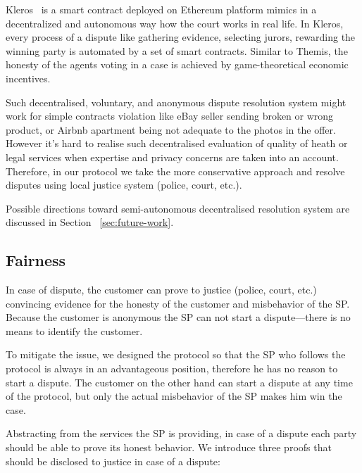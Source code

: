 \documentclass{ieeeaccess}
\begin{document}
Kleros~\cite{lesaege2018kleros} is a smart contract deployed on
Ethereum platform mimics in a decentralized and autonomous way how
the court works in real life. In Kleros, every process of a dispute like
gathering evidence, selecting jurors, rewarding the winning party is 
automated by a set of smart contracts. Similar to Themis, the honesty
of the agents voting in a case is achieved by game-theoretical economic
incentives.

Such decentralised, voluntary, and anonymous dispute resolution system
might work for simple contracts violation like eBay seller sending
broken or wrong product, or Airbnb apartment being not adequate to the
photos in the offer. However it's hard to realise such decentralised
evaluation of quality of heath or legal services when expertise and
privacy concerns are taken into an account. Therefore, in our protocol
we take the more conservative approach and resolve disputes using local
justice system (police, court, etc.).

Possible directions toward semi-autonomous decentralised resolution
system are discussed in Section ~\ref{sec:future-work}.


\subsection{Fairness}\label{proof-of-justice}

In case of dispute, the customer can prove to justice (police, court, etc.) convincing evidence for the honesty of the customer and misbehavior of the SP. 
Because the customer is anonymous the SP can not start a dispute---there is no means to identify the customer.

To mitigate the issue, we designed the protocol so that the SP who follows the protocol is always in an advantageous position, therefore he has no reason to start a dispute. The customer on the other hand can start a dispute at any time of the protocol, but only the actual misbehavior of the SP makes him win the case.



Abstracting from the services the SP is providing, in case of a dispute each party should be able to prove its honest behavior. We introduce three proofs that should be disclosed to justice in case of a dispute:
\end{document}
